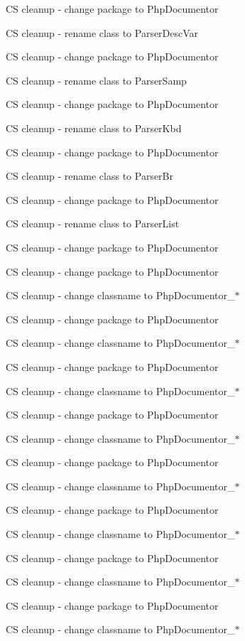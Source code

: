 \begin{DoxyRefList}
\-C\-S cleanup -\/ change package to \-Php\-Documentor 

\-C\-S cleanup -\/ rename class to \-Parser\-Desc\-Var 

\-C\-S cleanup -\/ change package to \-Php\-Documentor 

\-C\-S cleanup -\/ rename class to \-Parser\-Samp 

\-C\-S cleanup -\/ change package to \-Php\-Documentor 

\-C\-S cleanup -\/ rename class to \-Parser\-Kbd 

\-C\-S cleanup -\/ change package to \-Php\-Documentor 

\-C\-S cleanup -\/ rename class to \-Parser\-Br 

\-C\-S cleanup -\/ change package to \-Php\-Documentor 

\-C\-S cleanup -\/ rename class to \-Parser\-List 

\-C\-S cleanup -\/ change package to \-Php\-Documentor 

\-C\-S cleanup -\/ change package to \-Php\-Documentor 

\-C\-S cleanup -\/ change classname to \-Php\-Documentor\-\_\-$\ast$ 

\-C\-S cleanup -\/ change package to \-Php\-Documentor 

\-C\-S cleanup -\/ change classname to \-Php\-Documentor\-\_\-$\ast$ 

\-C\-S cleanup -\/ change package to \-Php\-Documentor 

\-C\-S cleanup -\/ change classname to \-Php\-Documentor\-\_\-$\ast$ 

\-C\-S cleanup -\/ change package to \-Php\-Documentor 

\-C\-S cleanup -\/ change classname to \-Php\-Documentor\-\_\-$\ast$ 

\-C\-S cleanup -\/ change package to \-Php\-Documentor 

\-C\-S cleanup -\/ change classname to \-Php\-Documentor\-\_\-$\ast$ 

\-C\-S cleanup -\/ change package to \-Php\-Documentor 

\-C\-S cleanup -\/ change classname to \-Php\-Documentor\-\_\-$\ast$ 

\-C\-S cleanup -\/ change package to \-Php\-Documentor 

\-C\-S cleanup -\/ change classname to \-Php\-Documentor\-\_\-$\ast$ 

\-C\-S cleanup -\/ change package to \-Php\-Documentor 

\-C\-S cleanup -\/ change classname to \-Php\-Documentor\-\_\-$\ast$ 


\end{DoxyRefList}

